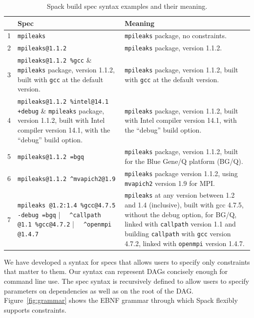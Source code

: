 \begin{table}\centering
\begin{tabular}{|r|p{2.4in}|p{4in}|}
\hline
& {\bf Spec} & {\bf Meaning} \\
\hline
\hline
1&\small\verb|mpileaks|                         & \small {\tt mpileaks} package, no constraints. \\\hline
2&\small\verb|mpileaks@1.1.2|                   & \small {\tt mpileaks} package, version 1.1.2. \\\hline
3&\small\verb|mpileaks@1.1.2 %gcc|              & \small {\tt mpileaks} package, version 1.1.2, built with {\tt gcc} at the default version. \\\hline
4&\small\verb|mpileaks@1.1.2 %intel@14.1 +debug| & \small {\tt mpileaks} package, version 1.1.2, built with Intel compiler version 14.1, \newline with the ``debug'' build option. \\\hline
5&\small\verb|mpileaks@1.1.2 =bgq|              & \small {\tt mpileaks} package, version 1.1.2, built for the Blue Gene/Q platform (BG/Q). \\\hline
6&\small\verb|mpileaks@1.1.2 ^mvapich2@1.9|     & \small {\tt mpileaks} package version 1.1.2, using {\tt mvapich2}  version 1.9 for MPI. \\\hline
7&\small\verb|mpileaks @1.2:1.4 %gcc@4.7.5 -debug =bgq| \newline
      \verb|  ^callpath @1.1 %gcc@4.7.2| \newline
      \verb|  ^openmpi @1.4.7|                & \small%
      {\tt mpileaks} at any version between 1.2 and 1.4 (inclusive), built with gcc 4.7.5,
      without the debug option, for BG/Q, linked with {\tt callpath} version 1.1
      and building {\tt callpath} with {\tt gcc} version 4.7.2, linked with {\tt openmpi} version 1.4.7.    \\
\hline
\end{tabular}
\caption{
	Spack build spec syntax examples and their meaning.
	\label{tab:specs}
}
\end{table}

We have developed a syntax for specs that allows users to specify
only constraints that matter to them. Our syntax can represent
DAGs concisely enough for command line use.
The spec syntax is recursively defined to allow users to specify
parameters on dependencies as well as on the root of the DAG.
Figure~\ref{fig:grammar} shows the EBNF grammar through which Spack
flexibly supports constraints.

